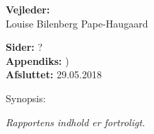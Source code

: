 \begin{minipage}[t]{0.48\textwidth}
\textbf{Vejleder:} %
\\\hspace*{2ex}
Louise Bilenberg Pape-Haugaard \\\hspace*{2ex}




\vspace*{1cm}

\textbf{Sider:} ? \\
\textbf{Appendiks:} ) \\ 
\textbf{Afsluttet:} 29.05.2018

\end{minipage}
\hfill
\begin{minipage}[t]{0.483\textwidth}
Synopsis:  \\[2pt]
\fbox{\parbox{7cm}{}}
\end{minipage}

\vfill
\begin{center}
{\footnotesize\itshape Rapportens indhold er fortroligt.}
\end{center}

